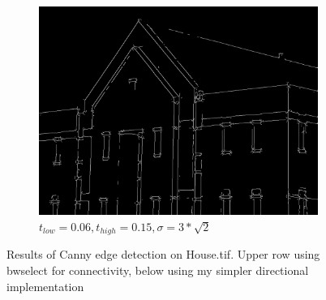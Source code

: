 \documentclass[a4paper]{article}
\begin{document}
\begin{figure}[h]
\begin{subfigure}[b]{0.3\textwidth}
        \end{subfigure}
        \begin{subfigure}[b]{0.3\textwidth}
                \centering
                \includegraphics[width=\textwidth]{q2-house-canny-0150063rt2-my.png}
                \caption{$t_{low}=0.06, t_{high}=0.15, \sigma=3*\sqrt{2}$}
                \label{fig:4f}
                
        \end{subfigure}
        
        \caption{Results of Canny edge detection on House.tif.  Upper row using bwselect for connectivity, below using my simpler directional implementation}        
        \label{fig:4}
\end{figure}
\end{document}
